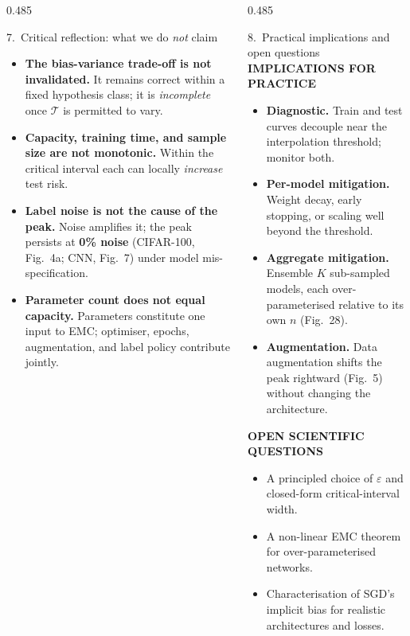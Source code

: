 \documentclass[final]{beamer}
\newcommand{\kw}[1]{\textcolor{uompurple}{\textbf{#1}}}
\newcommand{\eyebrow}[1]{{\color{uompurple}\footnotesize\bfseries\MakeUppercase{#1}}\par\vspace{-0.2ex}}
\newcommand{\T}{\mathcal{T}}
\begin{document}
\begin{frame}[t]{}
\begin{columns}[T,onlytextwidth]
\begin{column}{0.485\linewidth}
\begin{block}{7.~Critical reflection: what we do \emph{not} claim}
\begin{itemize}\setlength\itemsep{0.2ex}
\item \kw{The bias-variance trade-off is not invalidated.} It remains correct within a fixed hypothesis class; it is \emph{incomplete} once \(\T\) is permitted to vary.
\item \kw{Capacity, training time, and sample size are not monotonic.} Within the critical interval each can locally \emph{increase} test risk.
\item \kw{Label noise is not the cause of the peak.} Noise amplifies it; the peak persists at \kw{0\% noise} (CIFAR-100, Fig.~4a; CNN, Fig.~7) under model mis-specification.
\item \kw{Parameter count does not equal capacity.} Parameters constitute one input to EMC; optimiser, epochs, augmentation, and label policy contribute jointly.
\end{itemize}
\end{block}
\end{column}

\begin{column}{0.485\linewidth}
\begin{block}{8.~Practical implications and open questions}
\eyebrow{Implications for practice}
\begin{itemize}\setlength\itemsep{0.15ex}
\item \kw{Diagnostic.} Train and test curves decouple near the interpolation threshold; monitor both.
\item \kw{Per-model mitigation.} Weight decay, early stopping, or scaling well beyond the threshold.
\item \kw{Aggregate mitigation.} Ensemble \(K\) sub-sampled models, each over-parameterised relative to its own \(n\) (Fig.~28).
\item \kw{Augmentation.} Data augmentation shifts the peak rightward (Fig.~5) without changing the architecture.
\end{itemize}
\eyebrow{Open scientific questions}
\begin{itemize}\setlength\itemsep{0.15ex}
\item A principled choice of \(\varepsilon\) and closed-form critical-interval width.
\item A non-linear EMC theorem for over-parameterised networks.
\item Characterisation of SGD's implicit bias for realistic architectures and losses.
\end{itemize}
\end{block}
\end{column}
\end{columns}


\end{frame}
\end{document}
